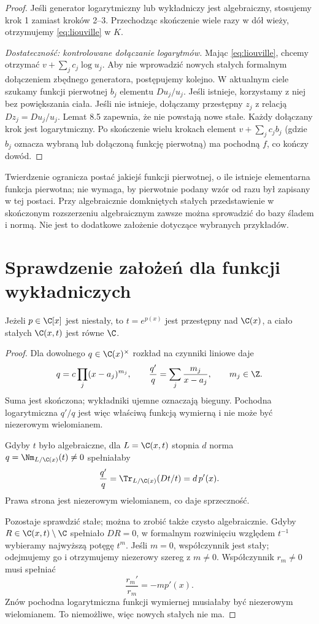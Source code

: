\begin{proof}
Jeśli generator logarytmiczny lub wykładniczy jest algebraiczny, stosujemy krok 1 zamiast kroków 2--3. Przechodząc skończenie wiele razy w dół wieży, otrzymujemy \eqref{eq:liouville} w $K$.

\emph{Dostateczność: kontrolowane dołączanie logarytmów.} Mając \eqref{eq:liouville}, chcemy otrzymać $v+\sum_j c_j\log u_j$. Aby nie wprowadzić nowych stałych formalnym dołączeniem zbędnego generatora, postępujemy kolejno. W aktualnym ciele szukamy funkcji pierwotnej $b_j$ elementu $Du_j/u_j$. Jeśli istnieje, korzystamy z niej bez powiększania ciała. Jeśli nie istnieje, dołączamy przestępny $z_j$ z relacją $Dz_j=Du_j/u_j$. Lemat 8.5 zapewnia, że nie powstają nowe stałe. Każdy dołączany krok jest logarytmiczny. Po skończenie wielu krokach element $v+\sum_j c_jb_j$ (gdzie $b_j$ oznacza wybraną lub dołączoną funkcję pierwotną) ma pochodną $f$, co kończy dowód.
\end{proof}

\begin{uwaga}
Twierdzenie ogranicza postać jakiejś funkcji pierwotnej, o ile istnieje elementarna funkcja pierwotna; nie wymaga, by pierwotnie podany wzór od razu był zapisany w tej postaci. Przy algebraicznie domkniętych stałych przedstawienie w skończonym rozszerzeniu algebraicznym zawsze można sprowadzić do bazy śladem i normą. Nie jest to dodatkowe założenie dotyczące wybranych przykładów.
\end{uwaga}

\section{Sprawdzenie założeń dla funkcji wykładniczych}

\begin{lemat}
Jeżeli $p\in\C[x]$ jest niestały, to $t=e^{p(x)}$ jest przestępny nad $\C(x)$, a ciało stałych $\C(x,t)$ jest równe $\C$.
\end{lemat}
\begin{proof}
Dla dowolnego $q\in\C(x)^\times$ rozkład na czynniki liniowe daje
\[
q=c\prod_j(x-a_j)^{m_j},\qquad
\frac{q'}{q}=\sum_j\frac{m_j}{x-a_j},\qquad m_j\in\Z.
\]
Suma jest skończona; wykładniki ujemne oznaczają bieguny. Pochodna logarytmiczna $q'/q$ jest więc właściwą funkcją wymierną i nie może być niezerowym wielomianem.

Gdyby $t$ było algebraiczne, dla $L=\C(x,t)$ stopnia $d$ norma $q=\Nm_{L/\C(x)}(t)\ne0$ spełniałaby
\[
\frac{q'}{q}=\Tr_{L/\C(x)}(Dt/t)=d\,p'(x).
\]
Prawa strona jest niezerowym wielomianem, co daje sprzeczność.

Pozostaje sprawdzić stałe; można to zrobić także czysto algebraicznie. Gdyby $R\in\C(x,t)\setminus\C$ spełniało $DR=0$, w formalnym rozwinięciu względem $t^{-1}$ wybieramy najwyższą potęgę $t^m$. Jeśli $m=0$, współczynnik jest stały; odejmujemy go i otrzymujemy niezerowy szereg z $m\ne0$. Współczynnik $r_m\ne0$ musi spełniać
\[
\frac{r_m'}{r_m}=-m p'(x).
\]
Znów pochodna logarytmiczna funkcji wymiernej musiałaby być niezerowym wielomianem. To niemożliwe, więc nowych stałych nie ma.
\end{proof}

